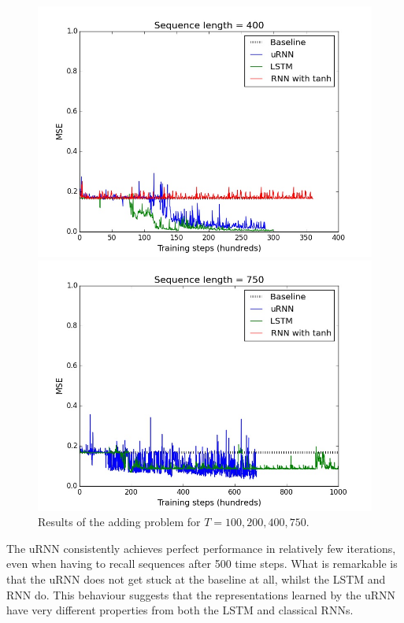 \documentclass{article} %
\begin{document}
\begin{figure}[t!]
\begin{minipage}[b]{0.5\linewidth}
    \includegraphics[scale=0.25]{figures/adding_400.jpeg}
    \end{minipage}%
  \begin{minipage}[b]{0.5\linewidth}
    \centering
    \includegraphics[scale=0.25]{figures/adding_750.jpeg}
  \end{minipage} 
  \caption{Results of the adding problem for $T=100, 200, 400, 750$.}
\end{figure}

The uRNN consistently achieves perfect performance in relatively few iterations, even when having to recall
sequences after 500 time steps. What is remarkable is that the uRNN does not get stuck at the baseline at 
all, whilst the LSTM and RNN do. This behaviour suggests that the representations learned by the uRNN
have very different properties from both the LSTM and classical RNNs. 
\end{document}
